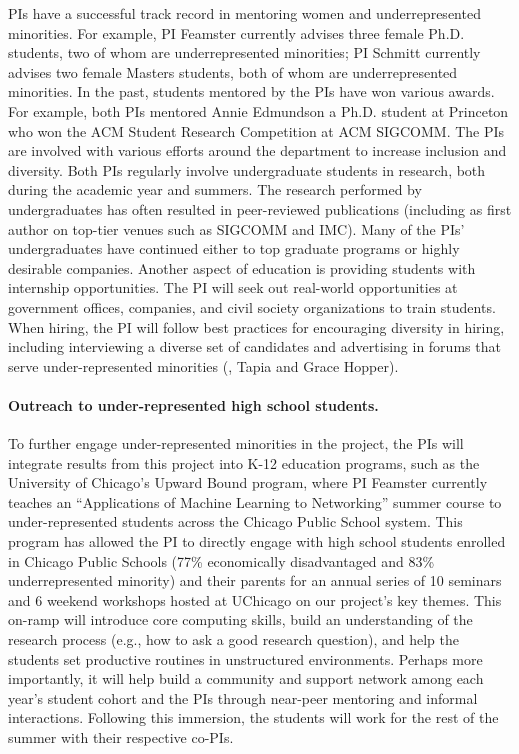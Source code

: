 PIs have a successful track record in mentoring women and underrepresented
minorities. For example, PI Feamster currently advises three female Ph.D.
students, two of whom are underrepresented minorities; PI Schmitt currently
advises two female Masters students, both of whom are underrepresented minorities. In the past, students mentored by
the PIs have won various awards. For example, both PIs mentored Annie
Edmundson a Ph.D. student at Princeton who won the ACM Student Research
Competition at ACM SIGCOMM. The PIs are involved with various efforts around
the department to increase inclusion and diversity.  Both PIs regularly
involve undergraduate students in research, both during the academic year and
summers.  The research performed by undergraduates has often resulted in
peer-reviewed publications (including as first author on top-tier venues such
as SIGCOMM and IMC).  Many of the PIs' undergraduates have continued either to
top graduate programs or highly desirable companies. Another aspect of
education is providing students with internship opportunities. The PI will
seek out real-world opportunities at government offices, companies, and civil
society organizations to train students.  When hiring, the PI will follow best
practices for encouraging diversity in hiring, including interviewing a
diverse set of candidates and advertising in forums that serve
under-represented minorities (\eg, Tapia and Grace Hopper).

\paragraph{Outreach to under-represented high school students.} To further
engage under-represented minorities in the project, the PIs will integrate
results from this project into K-12 education programs, such as the University
of Chicago's Upward Bound program, where PI Feamster currently teaches an
``Applications of Machine Learning to Networking'' summer course to
under-represented students across the Chicago Public School system.  This
program  has allowed the PI to directly engage with high school students
enrolled in Chicago Public Schools (77\% economically disadvantaged and 83\%
underrepresented minority) and their parents for an annual series of 10
seminars and 6 weekend workshops hosted at UChicago on our project's key
themes.  This on-ramp will introduce core computing skills, build an
understanding of the research process (e.g., how to ask a good research
question), and help the students set productive routines in unstructured
environments.  Perhaps more importantly, it will help build a community and
support network among each year's student cohort and the PIs through near-peer
mentoring and informal interactions.  Following this immersion, the students
will work for the rest of the summer with their respective co-PIs.

